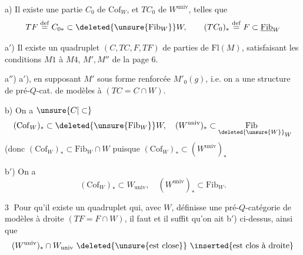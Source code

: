 
a) Il existe une partie  $C_0$ de $\mathrm{Cof}_W$, et $TC_0$ de
$W^{\mathrm{univ}}$, telles que
\[
 TF\overset{\mathrm{def}}{=}C_{0*}\subset\deleted{\unsure{\mathrm{Fib}_W}}W,\qquad
 (TC_0)_*\overset{\mathrm{def}}{=}F\subset\underline{\mathrm{Fib}}_W
\]

a$'$) Il existe un quadruplet $(C,TC,F,TF)$ de
parties de $\mathrm{Fl}(M)$, satisfaisant les conditions
$M1$ à $M4$, $M',M''$ de la page 6.

a$''$)  a$'$), en supposant $M'$ sous forme
renforcée   $M'_0(g)$, i.e. on a une structure
de pré-$Q$-cat. de modèles à  $(TC=C\cap W)$.

b) On a $\unsure{C|\subset}$
\[
 (\mathrm{Cof}_W)_*\subset\deleted{\unsure{\mathrm{Fib}_W}}W,\quad
 (W^{\mathrm{univ}})_*\subset\underset{\deleted{\unsure{W}}}{\mathrm{Fib}}_W
\]
(donc $(\mathrm{Cof}_W)_*\subset\mathrm{Fib}_W\cap W$ puisque
$(\mathrm{Cof}_W)_*\subset(W^{\mathrm{univ}})_*$

b$'$) On a
\[
 (\mathrm{Cof}_W)_*\subset W_{\mathrm{univ}},\quad
 (W^{\mathrm{univ}})_*\subset\mathrm{Fib}_W.
\]

\textcircled{3} Pour qu'il existe un quadruplet qui,
avec $W$, définisse une pré-$Q$-catégorie de
modèles à droite $(TF=F\cap W)$\inserted{\textsuperscript{$*$}}, il faut et
il suffit qu'on ait b$'$) ci-dessus, ainsi que
\[
 (W^{\mathrm{univ}})_*\cap W_{\mathrm{univ}}\ \text{\deleted{\unsure{est close}} \inserted{est clos à droite}}
\]
